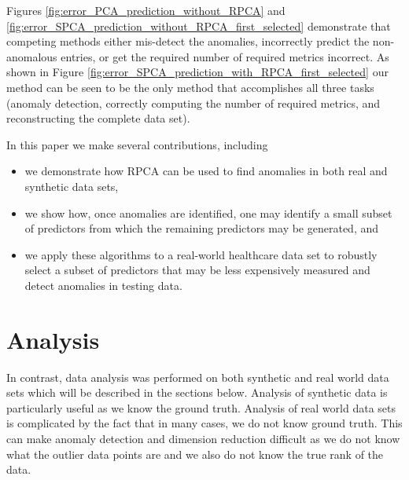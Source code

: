 \documentclass[conference]{IEEEtran}
\begin{document}
Figures \ref{fig:error_PCA_prediction_without_RPCA} and
\ref{fig:error_SPCA_prediction_without_RPCA_first_selected} demonstrate that competing methods either mis-detect the anomalies, incorrectly predict the non-anomalous entries, or get the required number of required metrics incorrect.
As shown in Figure \ref{fig:error_SPCA_prediction_with_RPCA_first_selected} our method can be seen to be the only method that accomplishes all three tasks (anomaly detection, correctly computing the number of required metrics, and reconstructing the complete data set).


In this paper we make several contributions, including

\begin{itemize}
    \item we demonstrate how RPCA can be used to find anomalies in both real and synthetic data sets,
    \item we show how, once anomalies are identified, one may identify a small subset of predictors from which the remaining predictors may be generated, and
    \item we apply these algorithms to a real-world healthcare data set to robustly select a subset of predictors that may be less expensively measured and detect anomalies in testing data.
\end{itemize}

\section{Analysis}
In contrast, data analysis was performed on both synthetic and real world data sets which will be described in the sections below. Analysis of synthetic data is particularly useful as we know the ground truth. Analysis of real world data sets is complicated by the fact that in many cases, we do not know ground truth.  This can make anomaly detection and dimension reduction difficult as we do not know what the outlier data points are and we also do not know the true rank of the data.
\end{document}
